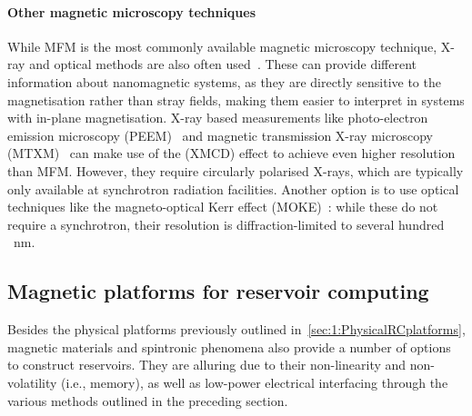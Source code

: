 \paragraph{Other magnetic microscopy techniques}
While MFM is the most commonly available magnetic microscopy technique, X-ray and optical methods are also often used~\cite{DynamicEmergence_NanomagneticSystem}.
These can provide different information about nanomagnetic systems, as they are directly sensitive to the magnetisation rather than stray fields, making them easier to interpret in systems with in-plane magnetisation.
X-ray based measurements like photo-electron emission microscopy (PEEM)~\cite{PEEM} and magnetic transmission X-ray microscopy (MTXM)~\cite{Imaging_MTXM} can make use of the  (XMCD) effect to achieve even higher resolution than MFM.
However, they require circularly polarised X-rays, which are typically only available at synchrotron radiation facilities.
Another option is to use optical techniques like the magneto-optical Kerr effect (MOKE)~\cite{KerrFaraday_book}: while these do not require a synchrotron, their resolution is diffraction-limited to several hundred \SI{}{\nano\metre}.

\subsection{Magnetic platforms for reservoir computing}\label{sec:1_RC_magnetic}
Besides the physical platforms previously outlined in~\cref{sec:1:PhysicalRCplatforms}, magnetic materials and spintronic phenomena also provide a number of options to construct reservoirs.
They are alluring due to their non-linearity and non-volatility (i.e., memory), as well as low-power electrical interfacing through the various methods outlined in the preceding section.

